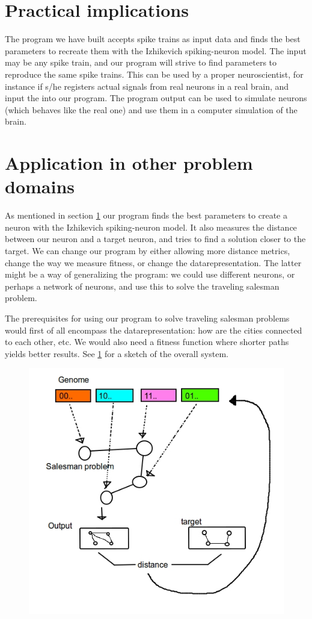 \documentclass[10pt]{article}
\begin{document}
\section{Practical implications}\label{sec:implications}
The program we have built accepts spike trains as input data and finds the best parameters to recreate them with the Izhikevich spiking-neuron model. The input may be any spike train, and our program will strive to find parameters to reproduce the same spike trains. This can be used by a proper neuroscientist, for instance if s/he registers actual signals from real neurons in a real brain, and input the into our program. The program output can be used to simulate neurons (which behaves like the real one) and use them in a computer simulation of the brain.
\section{Application in other problem domains}\label{sec:applications}
As mentioned in section \ref{sec:implications} our program finds the best parameters to create a neuron with the Izhikevich spiking-neuron model. It also measures the distance between our neuron and a target neuron, and tries to find a solution closer to the target. We can change our program by either allowing more distance metrics, change the way we measure fitness, or change the datarepresentation. The latter might be a way of generalizing the program: we could use different neurons, or perhaps a network of neurons, and use this to solve the traveling salesman problem.

The prerequisites for using our program to solve traveling salesman problems would first of all encompass the datarepresentation: how are the cities connected to each other, etc. We would also need a fitness function where shorter paths yields better results. See \ref{fig:fig1337} for a sketch of the overall system.
	\begin{figure}[H]
		\centering
			\includegraphics[width=0.5\linewidth]{./../images/sexyimage.jpg}
		\label{fig:fig1337}
	\end{figure}
\end{document}
